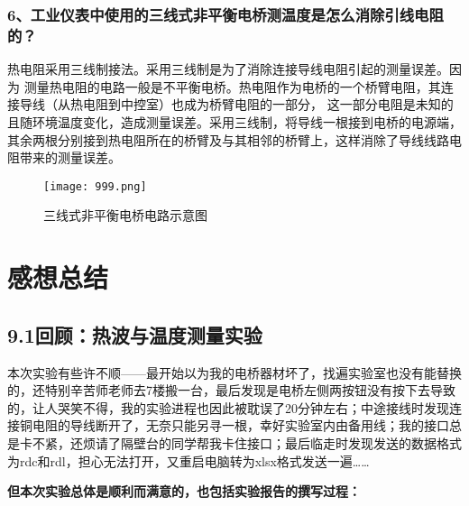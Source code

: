 \documentclass[11pt]{article}
\begin{document}
\subsubsection*{6、工业仪表中使用的三线式非平衡电桥测温度是怎么消除引线电阻的？}
\begin{framed}
{\kaishu 
热电阻采用三线制接法。采用三线制是为了消除连接导线电阻引起的测量误差。因为
测量热电阻的电路一般是不平衡电桥。热电阻作为电桥的一个桥臂电阻，其连接导线（从热电阻到中控室）也成为桥臂电阻的一部分，
这一部分电阻是未知的且随环境温度变化，造成测量误差。采用三线制，将导线一根接到电桥的电源端，其余两根分别接到热电阻所在的桥臂及与其相邻的桥臂上，这样消除了导线线路电阻带来的测量误差。
}
\begin{figure}[H]
    \centering
    \texttt{[image: 999.png]}
    \caption{三线式非平衡电桥电路示意图}
\end{figure}
\end{framed}




















\section{感想总结}
\subsection*{9.1\quad 回顾：热波与温度测量实验}
本次实验有些许不顺——最开始以为我的电桥器材坏了，找遍实验室也没有能替换的，还特别辛苦师老师去7楼搬一台，最后发现是电桥左侧两按钮没有按下去导致的，让人哭笑不得，我的实验进程也因此被耽误了20分钟左右；中途接线时发现连接铜电阻的导线断开了，无奈只能另寻一根，幸好实验室内由备用线；我的接口总是卡不紧，还烦请了隔壁台的同学帮我卡住接口；最后临走时发现发送的数据格式为rdc和rdl，担心无法打开，又重启电脑转为xlsx格式发送一遍……

\textbf{但本次实验总体是顺利而满意的，也包括实验报告的撰写过程：}
\end{document}
